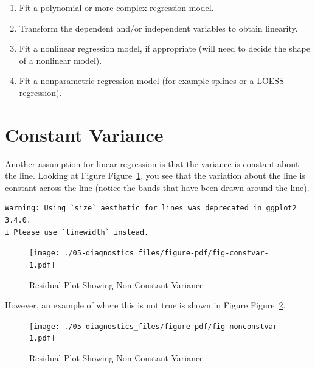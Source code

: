 \documentclass[
  letterpaper,
  DIV=11,
  numbers=noendperiod]{scrreprt}
\providecommand{\tightlist}{%
  \setlength{\itemsep}{0pt}\setlength{\parskip}{0pt}}\usepackage{longtable,booktabs,array}
\begin{document}
\begin{enumerate}
\def\labelenumi{\arabic{enumi}.}
\tightlist
\item
  Fit a polynomial or more complex regression model.\\
\item
  Transform the dependent and/or independent variables to obtain
  linearity.\\
\item
  Fit a nonlinear regression model, if appropriate (will need to decide
  the shape of a nonlinear model).\\
\item
  Fit a nonparametric regression model (for example splines or a LOESS
  regression).\\
\end{enumerate}

\hypertarget{constant-variance}{%
\section{Constant Variance}\label{constant-variance}}

Another assumption for linear regression is that the variance is
constant about the line. Looking at Figure Figure~\ref{fig-constvar},
you see that the variation about the line is constant across the line
(notice the bands that have been drawn around the line).

\begin{verbatim}
Warning: Using `size` aesthetic for lines was deprecated in ggplot2 3.4.0.
i Please use `linewidth` instead.
\end{verbatim}

\begin{figure}

{\centering \texttt{[image: ./05-diagnostics\_files/figure-pdf/fig-constvar-1.pdf]}

}

\caption{\label{fig-constvar}Residual Plot Showing Non-Constant
Variance}

\end{figure}

However, an example of where this is not true is shown in Figure
Figure~\ref{fig-nonconstvar}.

\begin{figure}

{\centering \texttt{[image: ./05-diagnostics\_files/figure-pdf/fig-nonconstvar-1.pdf]}

}

\caption{\label{fig-nonconstvar}Residual Plot Showing Non-Constant
Variance}

\end{figure}
\end{document}
